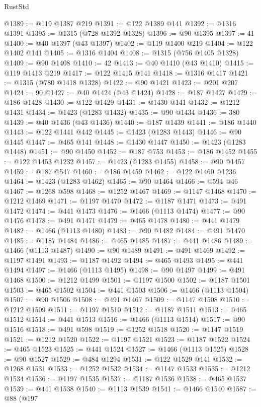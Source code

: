 \begin{lexlean}{RustStd}
\begin{coremodule}
{\begin{coremodule}
{{{{{{{{{{{{{{{{{{{{{{{{{{{{{{{{{{{{{{{{{{{{{{{@1389 := @119 @1387 @219
@1391 := @122 @1389 @141
@1392 := @1316 @1391
@1395 := @1315 (@728 @1392 @1328)
@1396 := @90 @1395
@1397 := 41
@1400 := @40 @1397 (@43 @1397)
@1402 := @119 @1400 @219
@1404 := @122 @1402 @141
@1405 := @1316 @1404
@1408 := @1315 (@756 @1405 @1328)
@1409 := @90 @1408
@1410 := 42
@1413 := @40 @1410 (@43 @1410)
@1415 := @119 @1413 @219
@1417 := @122 @1415 @141
@1418 := @1316 @1417
@1421 := @1315 (@780 @1418 @1328)
@1422 := @90 @1421
@1423 := @201 @207
@1424 := 90
@1427 := @40 @1424 (@43 @1424)
@1428 := @187 @1427
@1429 := @186 @1428
@1430 := @122 @1429
@1431 := @1430 @141
@1432 := @1212 @1431
@1434 := @1423 (@1283 @1432)
@1435 := @90 @1434
@1436 := 380
@1439 := @40 @1436 (@43 @1436)
@1440 := @187 @1439
@1441 := @186 @1440
@1443 := @122 @1441 @442
@1445 := @1423 (@1283 @1443)
@1446 := @90 @1445
@1447 := @465 @141
@1448 := @1430 @1447
@1450 := @1423 (@1283 @1448)
@1451 := @90 @1450
@1452 := @187 @753
@1453 := @186 @1452
@1455 := @122 @1453 @1232
@1457 := @1423 (@1283 @1455)
@1458 := @90 @1457
@1459 := @187 @547
@1460 := @186 @1459
@1462 := @122 @1460 @1236
@1464 := @1423 (@1283 @1462)
@1465 := @90 @1464
@1466 := @594 @46
@1467 := @1268 @598
@1468 := @1252 @1467
@1469 := @1147 @1468
@1470 := @1212 @1469
@1471 := @1197 @1470
@1472 := @1187 @1471
@1473 := @491 @1472
@1474 := @441 @1473
@1476 := @1466 (@1113 @1474)
@1477 := @90 @1476
@1478 := @491 @1471
@1479 := @465 @1478
@1480 := @441 @1479
@1482 := @1466 (@1113 @1480)
@1483 := @90 @1482
@1484 := @491 @1470
@1485 := @1187 @1484
@1486 := @465 @1485
@1487 := @441 @1486
@1489 := @1466 (@1113 @1487)
@1490 := @90 @1489
@1491 := @491 @1469
@1492 := @1197 @1491
@1493 := @1187 @1492
@1494 := @465 @1493
@1495 := @441 @1494
@1497 := @1466 (@1113 @1495)
@1498 := @90 @1497
@1499 := @491 @1468
@1500 := @1212 @1499
@1501 := @1197 @1500
@1502 := @1187 @1501
@1503 := @465 @1502
@1504 := @441 @1503
@1506 := @1466 (@1113 @1504)
@1507 := @90 @1506
@1508 := @491 @1467
@1509 := @1147 @1508
@1510 := @1212 @1509
@1511 := @1197 @1510
@1512 := @1187 @1511
@1513 := @465 @1512
@1514 := @441 @1513
@1516 := @1466 (@1113 @1514)
@1517 := @90 @1516
@1518 := @491 @598
@1519 := @1252 @1518
@1520 := @1147 @1519
@1521 := @1212 @1520
@1522 := @1197 @1521
@1523 := @1187 @1522
@1524 := @465 @1523
@1525 := @441 @1524
@1527 := @1466 (@1113 @1525)
@1528 := @90 @1527
@1529 := @484 @1294
@1531 := @122 @1529 @141
@1532 := @1268 @1531
@1533 := @1252 @1532
@1534 := @1147 @1533
@1535 := @1212 @1534
@1536 := @1197 @1535
@1537 := @1187 @1536
@1538 := @465 @1537
@1539 := @441 @1538
@1540 := @1113 @1539
@1541 := @1466 @1540
@1587 := @88
    (@197
}}}}}}}}}}}}}}}}}}}}}}}}}}}}}}}}}}}}}}}}}}}}}}}
\end{coremodule}}
\end{coremodule}
\end{lexlean}
